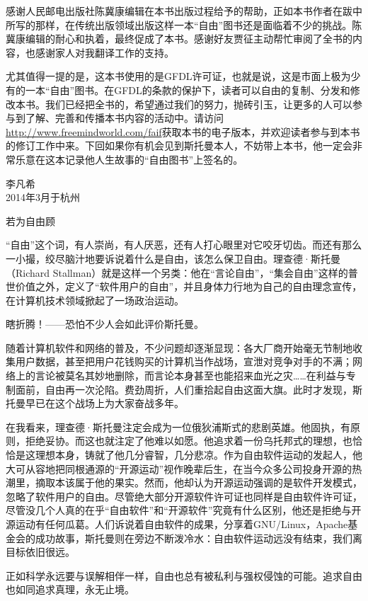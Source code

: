 感谢人民邮电出版社陈冀康编辑在本书出版过程给予的帮助，正如本书作者在跋中所写的那样，在传统出版领域出版这样一本``自由''图书还是面临着不少的挑战。陈冀康编辑的耐心和执着，最终促成了本书。感谢好友贾征主动帮忙审阅了全书的内容，也感谢家人对我翻译工作的支持。

尤其值得一提的是，这本书使用的是GFDL许可证，也就是说，这是市面上极为少有的一本``自由''图书。在GFDL的条款的保护下，读者可以自由的复制、分发和修改本书。我们已经把全书的，希望通过我们的努力，抛砖引玉，让更多的人可以参与到了解、完善和传播本书内容的活动中。请访问\url{http://www.freemindworld.com/faif}获取本书的电子版本，并欢迎读者参与到本书的修订工作中来。下回如果你有机会见到斯托曼本人，不妨带上本书，他一定会非常乐意在这本记录他人生故事的``自由图书''上签名的。


李凡希\\
2014年3月于杭州

若为自由顾

``自由''这个词，有人崇尚，有人厌恶，还有人打心眼里对它咬牙切齿。而还有那么一小撮，绞尽脑汁地要诉说着什么是自由，该怎么保卫自由。理查德·斯托曼（Richard Stallman）就是这样一个另类：他在``言论自由''，``集会自由''这样的普世价值之外，定义了``软件用户的自由''，并且身体力行地为自己的自由理念宣传，在计算机技术领域掀起了一场政治运动。

瞎折腾！——恐怕不少人会如此评价斯托曼。

随着计算机软件和网络的普及，不少问题却逐渐显现：各大厂商开始毫无节制地收集用户数据，甚至把用户花钱购买的计算机当作战场，宣泄对竞争对手的不满；网络上的言论被莫名其妙地删除，而言论本身甚至也能招来血光之灾……在利益与专制面前，自由再一次沦陷。费劲周折，人们重拾起自由这面大旗。此时才发现，斯托曼早已在这个战场上为大家奋战多年。

在我看来，理查德·斯托曼注定会成为一位俄狄浦斯式的悲剧英雄。他固执，有原则，拒绝妥协。而这也就注定了他难以如愿。他追求着一份乌托邦式的理想，也恰恰是这理想本身，铸就了他几分睿智，几分悲凉。作为自由软件运动的发起人，他大可从容地把同根通源的``开源运动''视作晚辈后生，在当今众多公司投身开源的热潮里，摘取本该属于他的果实。然而，他却认为开源运动强调的是软件开发模式，忽略了软件用户的自由。尽管绝大部分开源软件许可证也同样是自由软件许可证，尽管没几个人真的在乎“自由软件”和“开源软件”究竟有什么区别，他还是拒绝与开源运动有任何瓜葛。人们诉说着自由软件的成果，分享着GNU/Linux，Apache基金会的成功故事，斯托曼则在旁边不断泼冷水：自由软件运动远没有结束，我们离目标依旧很远。

正如科学永远要与误解相伴一样，自由也总有被私利与强权侵蚀的可能。追求自由也如同追求真理，永无止境。

